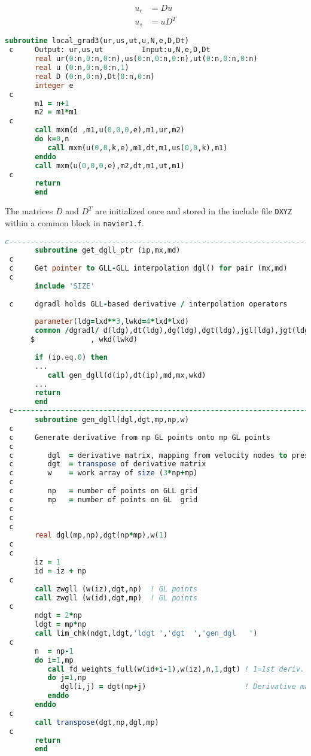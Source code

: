 \documentclass[
  a4paper,
  10pt]{article}
\newcommand{\passthrough}[1]{#1}
\begin{document}
\begin{align}
u_r &= D  u \\
u_s &= u D^T
\end{align}

\begin{lstlisting}[language=Fortran]
       subroutine local_grad3(ur,us,ut,u,N,e,D,Dt)
 c     Output: ur,us,ut         Input:u,N,e,D,Dt
       real ur(0:n,0:n,0:n),us(0:n,0:n,0:n),ut(0:n,0:n,0:n)
       real u (0:n,0:n,0:n,1)
       real D (0:n,0:n),Dt(0:n,0:n)
       integer e
 c
       m1 = n+1
       m2 = m1*m1
 c
       call mxm(d ,m1,u(0,0,0,e),m1,ur,m2)
       do k=0,n
          call mxm(u(0,0,k,e),m1,dt,m1,us(0,0,k),m1)
       enddo
       call mxm(u(0,0,0,e),m2,dt,m1,ut,m1)
 c
       return
       end
\end{lstlisting}

The matrices \(D\) and \(D^T\) are initialized once and stored in the
include file \passthrough{\lstinline!DXYZ!} within a common block in
\passthrough{\lstinline!navier1.f!}.

\begin{lstlisting}[language=Fortran]
 c-----------------------------------------------------------------------
       subroutine get_dgll_ptr (ip,mx,md)
 c
 c     Get pointer to GLL-GLL interpolation dgl() for pair (mx,md)
 c
       include 'SIZE'
 
 c     dgradl holds GLL-based derivative / interpolation operators
 
       parameter(ldg=lxd**3,lwkd=4*lxd*lxd)
       common /dgradl/ d(ldg),dt(ldg),dg(ldg),dgt(ldg),jgl(ldg),jgt(ldg)
      $             , wkd(lwkd)
       
       if (ip.eq.0) then
       ...
          call gen_dgll(d(ip),dt(ip),md,mx,wkd)
       ...
       return
       end
 c-----------------------------------------------------------------------
       subroutine gen_dgll(dgl,dgt,mp,np,w)
 c
 c     Generate derivative from np GL points onto mp GL points
 c
 c        dgl  = derivative matrix, mapping from velocity nodes to pressure
 c        dgt  = transpose of derivative matrix
 c        w    = work array of size (3*np+mp)
 c
 c        np   = number of points on GLL grid
 c        mp   = number of points on GL  grid
 c
 c
 c
       real dgl(mp,np),dgt(np*mp),w(1)
 c
 c
       iz = 1
       id = iz + np
 c
       call zwgll (w(iz),dgt,np)  ! GL points
       call zwgll (w(id),dgt,mp)  ! GL points
 c
       ndgt = 2*np
       ldgt = mp*np
       call lim_chk(ndgt,ldgt,'ldgt ','dgt  ','gen_dgl   ')
 c
       n  = np-1
       do i=1,mp
          call fd_weights_full(w(id+i-1),w(iz),n,1,dgt) ! 1=1st deriv.
          do j=1,np
             dgl(i,j) = dgt(np+j)                       ! Derivative matrix
          enddo
       enddo
 c
       call transpose(dgt,np,dgl,mp)
 c
       return
       end
\end{lstlisting}
\end{document}
